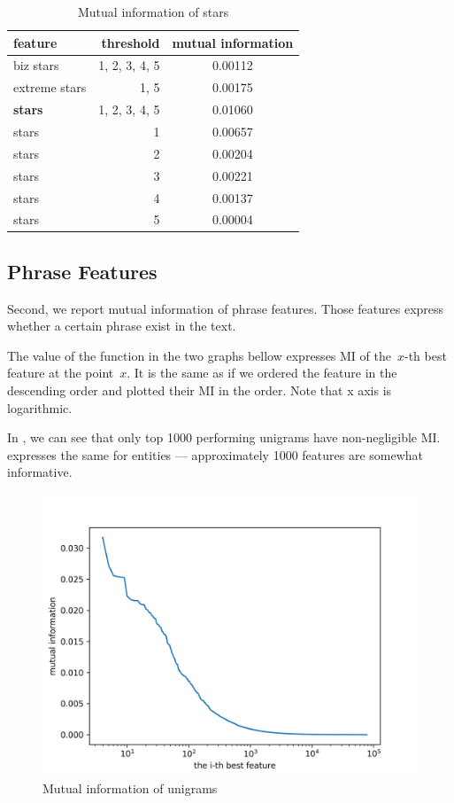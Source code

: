 \begin{table}[h!]
\centering
\begin{tabular}{lrS[table-format=3.2]}
\toprule
\textbf{feature} & \textbf{threshold} & \textbf{mutual information} \\
\midrule
biz stars & 1, 2, 3, 4, 5 & 0.00112 \\
extreme stars & 1, 5 & 0.00175 \\
\textbf{stars} & 1, 2, 3, 4, 5& 0.01060 \\
stars & 1 & 0.00657 \\
stars & 2 & 0.00204 \\
stars & 3 & 0.00221 \\
stars & 4 & 0.00137 \\
stars & 5 & 0.00004 \\
\bottomrule
\end{tabular}

\caption{Mutual information of stars}\label{tab:mi_stars}
\end{table}


\subsection{Phrase Features}

Second, we report mutual information of phrase features.
Those features express whether a certain phrase exist in the text.

The value of the function in the two graphs bellow expresses
MI of the~$x$-th best feature at the point~$x$.
It is the same as if we ordered the feature in the descending order
and plotted their MI in the order.
Note that x axis is logarithmic.

In ,
we can see that only top 1000 performing unigrams have non-negligible MI.
 expresses the same for entities
--- approximately 1000 features are somewhat informative.


\begin{figure}[ht]\centering
\includegraphics[width=130mm]{figures/unigrams.png}
\caption{Mutual information of unigrams}\label{fig:mi_unigrams}
\end{figure}


